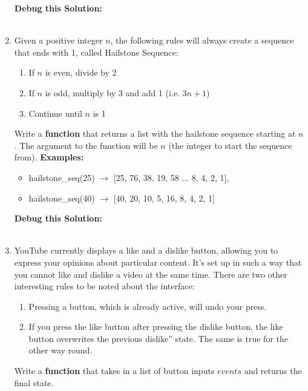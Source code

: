 \documentclass{article}
\newcommand{\csq}[1]{\reflectbox{''}#1''}  %
\begin{document}
\begin{enumerate}
		\textbf{Debug this Solution:}\\
		\mbox{ \hspace*{0.25in}	}

\pagebreak




	\item 
		Given a positive integer $n$, the following rules will always create a sequence that 
		ends with 1, called Hailstone Sequence:
		\begin{enumerate}
			\item If $n$ is even, divide by 2
			\item If $n$ is odd, multiply by 3 and add 1 (i.e. $3n+1$)
			\item Continue until $n$ is 1
		\end{enumerate}
		Write a \textbf{function} that returns a list with the hailstone sequence starting at $n$. 
		The argument to the function will be $n$ (the integer to start the sequence from).
		\textbf{Examples:}		
		\begin{itemize}
			\item  hailstone\_seq(25) $\rightarrow$ [25, 76, 38, 19, 58 ... 8, 4, 2, 1], 
			\item  hailstone\_seq(40) $\rightarrow$ [40, 20, 10, 5, 16, 8, 4, 2, 1]
		\end{itemize}

		\textbf{Debug this Solution:}\\
		\mbox{ \hspace*{0.25in}	}

\pagebreak




	\item
		YouTube currently displays a like and a dislike button, allowing you to express your opinions 
		about particular content. 
		It's set up in such a way that you cannot like and dislike a video at the same time.
		There are two other interesting rules to be noted about the interface:
		\begin{enumerate}
			\item Pressing a button, which is already active, will undo your press.
			\item If you press the like button after pressing the dislike button, the like button overwrites 
				the previous \csq{dislike} state. The same is true for the other way round.
		\end{enumerate}
		Write a \textbf{function} that takes in a list of button inputs $events$ and returns the final state.


\end{enumerate}
\end{document}
